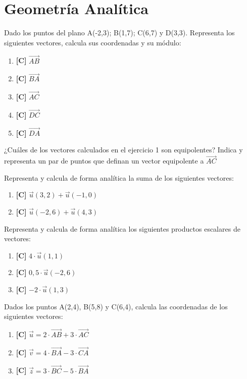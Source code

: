 \chapter{Geometría Analítica}
\setcounter{exercicio}{0}


\Exercicio Dado los puntos del plano A(-2,3); B(1,7); C(6,7) y D(3,3). Representa los siguientes vectores, calcula sus coordenadas y su módulo:

\begin{enumerate}[topsep=0pt]
	\item \textbf{[C]} $\overrightarrow{AB}$
	\item \textbf{[C]} $\overrightarrow{BA}$
	\item \textbf{[C]} $\overrightarrow{AC}$
	\item \textbf{[C]} $\overrightarrow{DC}$
	\item \textbf{[C]} $\overrightarrow{DA}$
\end{enumerate}


\Exercicio ¿Cuáles de los vectores calculados en el ejercicio 1 son equipolentes? Indica y representa un par de puntos que definan un vector equipolente a $\vec{AC}$

\Exercicio Representa y calcula de forma analítica la suma de los siguientes vectores:

\begin{enumerate}[topsep=0pt]
	\item \textbf{[C]} $\overrightarrow{u}(3,2) + \overrightarrow{u}(-1,0)$
	\item \textbf{[C]} $\overrightarrow{u}(-2,6) + \overrightarrow{u}(4,3)$
\end{enumerate}


\Exercicio Representa y calcula de forma analítica los siguientes productos escalares de vectores:
\begin{enumerate}[topsep=0pt]
	\item \textbf{[C]} $ 4 \cdot \overrightarrow{u}(1,1)$
	\item \textbf{[C]} $ 0,5 \cdot \overrightarrow{u}(-2,6)$
	\item \textbf{[C]} $ -2 \cdot \overrightarrow{u}(1,3)$
\end{enumerate}


\Exercicio Dados los puntos A(2,4), B(5,8) y C(6,4), calcula las coordenadas de los siguientes vectores:

\begin{enumerate}[topsep=0pt]
	\item \textbf{[C]} $ \vec{u} = 2 \cdot \vec{AB} + 3 \cdot \vec{AC} $
	\item \textbf{[C]} $ \vec{v} = 4 \cdot \vec{BA} - 3 \cdot \vec{CA} $
	\item \textbf{[C]} $ \vec{z} = 3 \cdot \vec{BC} - 5 \cdot \vec{BA} $
\end{enumerate}


